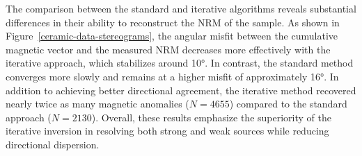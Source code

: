 \documentclass[onecolumn,12pt,a4paper]{article}
\begin{document}
The comparison between the standard and iterative algorithms reveals substantial differences in their ability to reconstruct the NRM of the sample. As shown in Figure~\ref{ceramic-data-stereograms}, the angular misfit between the cumulative magnetic vector and the measured NRM decreases more effectively with the iterative approach, which stabilizes around \ang{10}. In contrast, the standard method converges more slowly and remains at a higher misfit of approximately \ang{16}. In addition to achieving better directional agreement, the iterative method recovered nearly twice as many magnetic anomalies (\(N=4655\)) compared to the standard approach (\(N=2130\)). Overall, these results emphasize the superiority of the iterative inversion in resolving both strong and weak sources while reducing directional dispersion.

\end{document}
